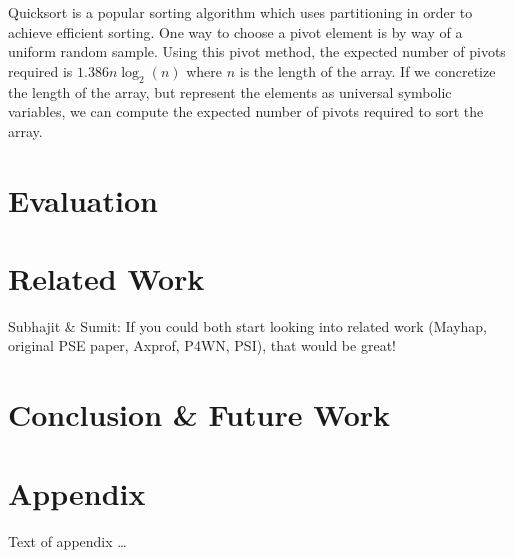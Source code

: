 \documentclass[acmsmall,review]{acmart}\settopmatter{}
\begin{document}
	Quicksort is a popular sorting algorithm which uses partitioning in order to achieve efficient sorting.
	One way to choose a pivot element is by way of a uniform random sample.
	Using this pivot method, the expected number of pivots required is $1.386 n \log_2(n)$ where $n$ is the length of the array.
	If we concretize the length of the array, but represent the elements as universal symbolic variables, we can compute the expected number of pivots required to sort the array.
	
	
	\section{Evaluation}
	\label{sec:eval}
	
	\section{Related Work}
	\label{sec:related}
	{\color{red} Subhajit \& Sumit: If you could both start looking into related work (Mayhap, original PSE paper, Axprof, P4WN, PSI), that would be great!}
	\section{Conclusion \& Future Work}
	\label{sec:conclusion}
	
	
	\begin{acks}                            %
	\end{acks}
	
	
	
	
	
	\appendix
	\section{Appendix}
	
	Text of appendix \ldots
	
\end{document}
